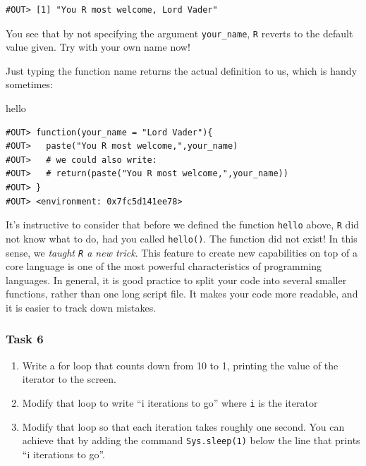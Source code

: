 \documentclass[]{book}
\newenvironment{Shaded}{\begin{snugshade}}{\end{snugshade}}
\newcommand{\NormalTok}[1]{#1}
\providecommand{\tightlist}{%
  \setlength{\itemsep}{0pt}\setlength{\parskip}{0pt}}
\begin{document}
\begin{verbatim}
#OUT> [1] "You R most welcome, Lord Vader"
\end{verbatim}

You see that by not specifying the argument \texttt{your\_name}, \texttt{R} reverts to the default value given. Try with your own name now!

Just typing the function name returns the actual definition to us, which is handy sometimes:

\begin{Shaded}
\begin{Highlighting}[]
\NormalTok{hello}
\end{Highlighting}
\end{Shaded}

\begin{verbatim}
#OUT> function(your_name = "Lord Vader"){
#OUT>   paste("You R most welcome,",your_name)
#OUT>   # we could also write:
#OUT>   # return(paste("You R most welcome,",your_name))
#OUT> }
#OUT> <environment: 0x7fc5d141ee78>
\end{verbatim}

It's instructive to consider that before we defined the function \texttt{hello} above, \texttt{R} did not know what to do, had you called \texttt{hello()}. The function did not exist! In this sense, we \emph{taught \texttt{R} a new trick}. This feature to create new capabilities on top of a core language is one of the most powerful characteristics of programming languages. In general, it is good practice to split your code into several smaller functions, rather than one long script file. It makes your code more readable, and it is easier to track down mistakes.

\hypertarget{task-6}{%
\subsubsection{Task 6}\label{task-6}}

\begin{enumerate}
\def\labelenumi{\arabic{enumi}.}
\tightlist
\item
  Write a for loop that counts down from 10 to 1, printing the value of the iterator to the screen.
\item
  Modify that loop to write ``i iterations to go'' where \texttt{i} is the iterator
\item
  Modify that loop so that each iteration takes roughly one second. You can achieve that by adding the command \texttt{Sys.sleep(1)} below the line that prints ``i iterations to go''.
\end{enumerate}
\end{document}
